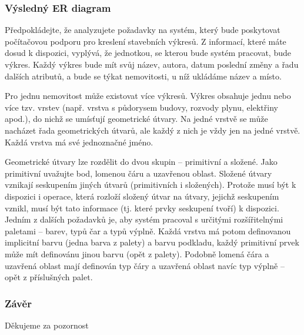 \documentclass{beamer}
\begin{document}
  \begin{frame}
      \scriptsize{
      \frametitle{Výsledný ER diagram}
      Předpokládejte, že analyzujete požadavky na systém, který bude poskytovat počítačovou 
      podporu pro kreslení stavebních výkresů. Z informací, které máte dosud k dispozici,
      vyplývá, že jednotkou, se kterou bude systém pracovat, bude výkres. Každý výkres bude
      mít svůj název, autora, datum poslední změny a řadu dalších atributů, a bude se týkat
      nemovitosti, u níž ukládáme název a místo.\par


      \hspace{0.5cm}Pro jednu nemovitost může existovat více výkresů. Výkres obsahuje jednu nebo více tzv.
      vrstev (např. vrstva s půdorysem budovy, rozvody plynu, elektřiny apod.), do nichž se
      umísťují geometrické útvary. Na jedné vrstvě se může nacházet řada geometrických útvarů,
      ale každý z nich je vždy jen na jedné vrstvě. Každá vrstva má své jednoznačné jméno.\par

  
      \hspace{0.5cm}Geometrické útvary lze rozdělit do dvou skupin -- primitivní a složené. Jako primitivní
      uvažujte bod, lomenou čáru a uzavřenou oblast. Složené útvary vznikají seskupením jiných
      útvarů (primitivních i složených). Protože musí být k dispozici i operace, která rozloží
      složený útvar na útvary, jejichž seskupením vznikl, musí být tato informace (tj. které
      prvky seskupení tvoří) k dispozici. Jedním z dalších požadavků je, aby systém pracoval
      s určitými rozšířitelnými paletami -- barev, typů čar a typů výplně. Každá vrstva má
      potom definovanou implicitní barvu (jedna barva  z  palety) a barvu podkladu, každý
      primitivní prvek může mít definovánu jinou barvu (opět z palety). Podobně lomená čára
      a uzavřená oblast mají definován typ čáry a uzavřená oblast navíc typ výplně – opět
      z příslušných palet.\par}
  \end{frame}
  \begin{frame}
    \frametitle{Závěr}
    \begin{center}   
      Děkujeme za pozornost
    \end{center}
  \end{frame}
\end{document}
